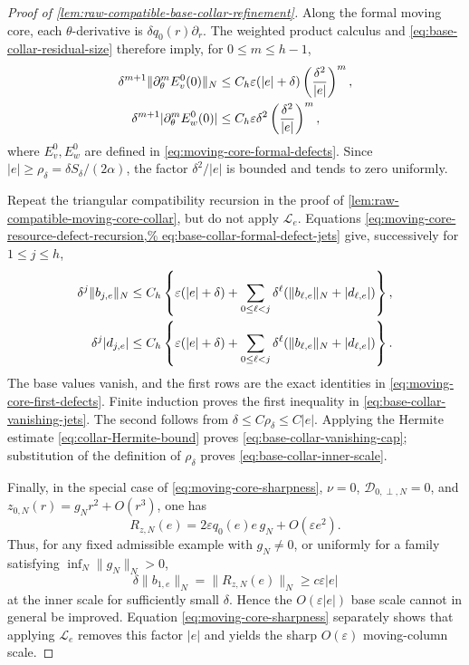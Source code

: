\begin{proof}[Proof of
\cref{lem:raw-compatible-base-collar-refinement}]
Along the formal moving core, each \(\theta\)-derivative is
\(\delta q_0(r)\partial_r\).  The weighted product calculus and
\cref{eq:base-collar-residual-size} therefore imply, for
\(0\le m\le h-1\),
\begin{align}
 \delta^{m+1}
 \|\partial_\theta^mE_v^0(0)\|_N
 &\le C_h\varepsilon(|e|+\delta)
       \left(\frac{\delta^2}{|e|}\right)^m,\notag\\
 \delta^{m+1}|\partial_\theta^mE_w^0(0)|
 &\le C_h\varepsilon\delta^2
       \left(\frac{\delta^2}{|e|}\right)^m,       \label{eq:base-collar-formal-defect-jets}
\end{align}
where \(E_v^0,E_w^0\) are defined in
\cref{eq:moving-core-formal-defects}.  Since
\(|e|\ge\rho_\delta=\delta S_\delta/(2\alpha)\), the factor
\(\delta^2/|e|\) is bounded and tends to zero uniformly.

Repeat the triangular compatibility recursion in the proof of
\cref{lem:raw-compatible-moving-core-collar}, but do not apply
\(\mathcal L_e\).  Equations
\cref{eq:moving-core-resource-defect-recursion,%
eq:base-collar-formal-defect-jets} give, successively for
\(1\le j\le h\),
\begin{align}
 \delta^j\|b_{j,e}\|_N
 &\le C_h\left\{\varepsilon(|e|+\delta)
   +\sum_{0\le\ell<j}\delta^\ell
       (\|b_{\ell,e}\|_N+|d_{\ell,e}|)\right\},\notag\\
 \delta^j|d_{j,e}|
 &\le C_h\left\{\varepsilon(|e|+\delta)
   +\sum_{0\le\ell<j}\delta^\ell
       (\|b_{\ell,e}\|_N+|d_{\ell,e}|)\right\}.   \label{eq:base-collar-refined-recursion}
\end{align}
The base values vanish, and the first rows are the exact identities in
\cref{eq:moving-core-first-defects}.  Finite induction proves the first
inequality in \cref{eq:base-collar-vanishing-jets}.  The second follows
from \(\delta\le C\rho_\delta\le C|e|\).  Applying the Hermite estimate
\cref{eq:collar-Hermite-bound} proves
\cref{eq:base-collar-vanishing-cap}; substitution of the definition of
\(\rho_\delta\) proves \cref{eq:base-collar-inner-scale}.

Finally, in the special case of
\cref{eq:moving-core-sharpness},
\(\nu=0\), \(\mathcal D_{0,\perp,N}=0\), and
\(z_{0,N}(r)=g_Nr^2+O(r^3)\), one has
\[
 R_{z,N}(e)
 =2\varepsilon q_0(e)e\,g_N+O(\varepsilon e^2).
\]
Thus, for any fixed admissible example with \(g_N\ne0\), or uniformly
for a family satisfying
\(\inf_N\|g_N\|_N>0\),
\[
 \delta\|b_{1,e}\|_N=\|R_{z,N}(e)\|_N
 \ge c\varepsilon|e|
\]
at the inner scale for sufficiently small \(\delta\).  Hence the
\(O(\varepsilon|e|)\) base scale cannot in general be improved.
Equation \cref{eq:moving-core-sharpness} separately shows that applying
\(\mathcal L_e\) removes this factor \(|e|\) and yields the sharp
\(O(\varepsilon)\) moving-column scale.
\end{proof}

